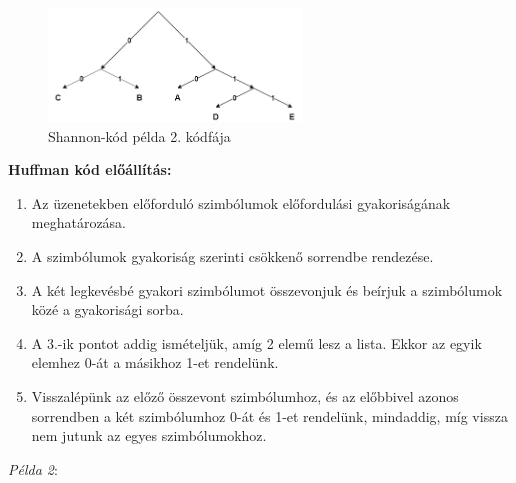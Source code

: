 \documentclass[12pt,margin=0px]{article}
\begin{document}
    \begin{figure}[H]
    \centering
    \includegraphics[width=0.6\textwidth]{img/shannon_code_tree.png}
    \caption{Shannon-kód példa 2. kódfája}
    \label{fig:shannon_code_tree}
    \end{figure}

    \noindent \textbf{Huffman kód előállítás:}

    \begin{enumerate}
        \item Az üzenetekben előforduló szimbólumok előfordulási gyakoriságának meghatározása.
        \item A szimbólumok gyakoriság szerinti csökkenő sorrendbe rendezése.
        \item A két legkevésbé gyakori szimbólumot összevonjuk és  beírjuk a szimbólumok közé a gyakorisági sorba.
        \item A 3.-ik pontot addig ismételjük, amíg 2 elemű lesz a lista.  Ekkor az egyik elemhez 0-át a másikhoz 1-et rendelünk.
        \item Visszalépünk az előző összevont szimbólumhoz, és az  előbbivel azonos sorrendben a két szimbólumhoz 0-át és 1-et rendelünk, mindaddig, míg vissza nem jutunk az egyes szimbólumokhoz.\\
    \end{enumerate}

    \noindent \emph{Példa 2}:\\
\end{document}
